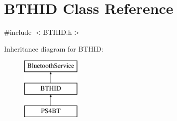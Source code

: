 \hypertarget{class_b_t_h_i_d}{\section{\-B\-T\-H\-I\-D \-Class \-Reference}
\label{class_b_t_h_i_d}
}


{\ttfamily \#include $<$\-B\-T\-H\-I\-D.\-h$>$}

\-Inheritance diagram for \-B\-T\-H\-I\-D\-:\begin{figure}[H]
\begin{center}
\leavevmode
\includegraphics[height=3.000000cm]{class_b_t_h_i_d}
\end{center}
\end{figure}
